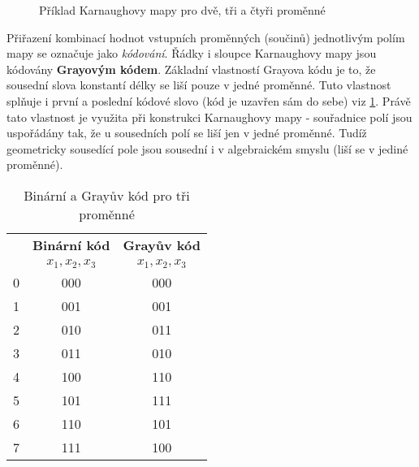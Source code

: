       \begin{figure}[hb!]
          \centering
        \caption{Příklad Karnaughovy mapy pro dvě, tři a čtyři proměnné}\label{CES:karnaugh_234}
      \end{figure}     
      
      Přiřazení kombinací hodnot vstupních proměnných (součinů) jednotlivým polím mapy se označuje 
      jako \emph{kódování}. Řádky i sloupce Karnaughovy mapy jsou kódovány \textbf{Grayovým kódem}. 
      Základní vlastností Grayova kódu je to, že sousední slova konstantí délky se liší pouze v 
      jedné proměnné. Tuto vlastnost splňuje i první a poslední kódové slovo (kód je uzavřen sám
      do sebe) viz \ref{CES:BCD_Gray_c}. Právě tato vlastnost je využita při konstrukci Karnaughovy 
      mapy - souřadnice polí jsou uspořádány tak, že u sousedních polí se liší jen v jedné 
      proměnné. Tudíž geometricky sousedící pole jsou sousední i v algebraickém smyslu (liší se v 
      jediné proměnné).  
      
     \begin{table}[ht!] 
       \centering 
       \begin{tabular}{|c|c|c|}
         \hline
         \rowcolor{CornflowerBlue}{\textbf{Číslo}}  & \textbf{Binární kód} & \textbf{Grayův kód} \\
         \rowcolor{CornflowerBlue}{ }               &     {$x_1,x_2,x_3$}  & {$x_1,x_2,x_3$}     \\
          \hline\hline  
             \cellcolor[gray]{0.9}0                 & 000                  & 000               \\
          \hline       
             \cellcolor[gray]{0.9}1                 & 001                  & 001               \\
          \hline  
             \cellcolor[gray]{0.9}2                 & 010                  & 011               \\
          \hline  
             \cellcolor[gray]{0.9}3                 & 011                  & 010               \\
          \hline  
             \cellcolor[gray]{0.9}4                 & 100                  & 110               \\
          \hline         
             \cellcolor[gray]{0.9}5                 & 101                  & 111               \\
          \hline  
             \cellcolor[gray]{0.9}6                 & 110                  & 101               \\
          \hline  
             \cellcolor[gray]{0.9}7                 & 111                  & 100               \\
          \hline
       \end{tabular}
       \caption{Binární a Grayův kód pro tři proměnné}
       \label{CES:BCD_Gray_c}    
     \end{table}       
      

